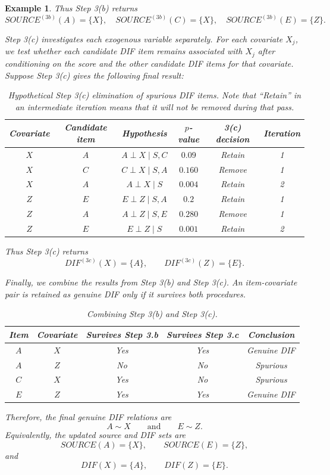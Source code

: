 \documentclass[a4project,12pt]{article}
\theoremstyle{examplestyle}
\newtheorem{example}{Example}[section]
\theoremstyle{defstyle}
\theoremstyle{thmstyle}
\begin{document}
\begin{mybox3}
\begin{example}
Thus Step 3(b) returns
\[
SOURCE^{(3b)}(A)=\{X\}, \quad
SOURCE^{(3b)}(C)=\{X\}, \quad
SOURCE^{(3b)}(E)=\{Z\}.
\]

Step 3(c) investigates each exogenous variable separately. For each covariate
$X_j$, we test whether each candidate DIF item remains associated with $X_j$
after conditioning on the score and the other candidate DIF items for that
covariate. Suppose Step 3(c) gives the following final result:

\begin{table}[H]
\centering
\begin{tabular}{c c c c c c}
\hline
Covariate & Candidate item & Hypothesis & $p$-value & 3(c) decision & Iteration\\
\hline
$X$ & $A$ & $A \perp X \mid S,C$ & $0.09$ & Retain & 1\\
$X$ & $C$ & $C \perp X \mid S,A$ & $0.160$ & Remove & 1 \\
$X$ & $A$ & $A \perp X \mid S$ & $0.004$ & Retain & 2\\
$Z$ & $E$ & $E \perp Z \mid S,A$ & $0.2$ & Retain & 1 \\
$Z$ & $A$ & $A \perp Z \mid S,E$ & $0.280$ & Remove & 1\\
$Z$ & $E$ & $E \perp Z \mid S$ & $0.001$ & Retain & 2\\
\hline
\end{tabular}
\caption{Hypothetical Step 3(c) elimination of spurious DIF items. Note that “Retain” in an intermediate iteration means that it will not be removed during that pass.}
\label{tab:step3_example_3c}
\end{table}

Thus Step 3(c) returns
\[
DIF^{(3c)}(X)=\{A\}, \qquad
DIF^{(3c)}(Z)=\{E\}.
\]

Finally, we combine the results from Step 3(b) and Step 3(c). An item-covariate
pair is retained as genuine DIF only if it survives both procedures.

\begin{table}[H]
\centering
\begin{tabular}{c c c c c}
\hline
Item & Covariate & Survives Step 3.b & Survives Step 3.c & Conclusion \\
\hline
$A$ & $X$ & Yes & Yes & Genuine DIF \\
$A$ & $Z$ & No & No & Spurious \\
$C$ & $X$ & Yes & No & Spurious \\
$E$ & $Z$ & Yes & Yes & Genuine DIF \\
\hline
\end{tabular}
\caption{Combining Step 3(b) and Step 3(c).}
\label{tab:step3_example_combined}
\end{table}

Therefore, the final genuine DIF relations are
\[
A \sim X
\qquad \text{and} \qquad
E \sim Z.
\]
Equivalently, the updated source and DIF sets are
\[
SOURCE(A)=\{X\}, \qquad SOURCE(E)=\{Z\},
\]
and
\[
DIF(X)=\{A\}, \qquad DIF(Z)=\{E\}.
\]
\end{example}
\end{mybox3}
\end{document}
